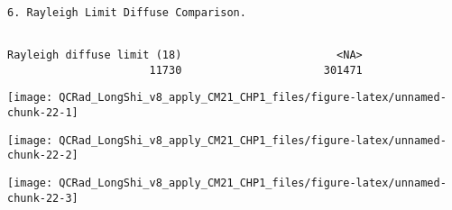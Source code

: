 \documentclass[
  10pt,
  a4paper,oneside]{article}
\newenvironment{Shaded}{\begin{snugshade}}{\end{snugshade}}
\newcommand{\AttributeTok}[1]{\textcolor[rgb]{0.77,0.63,0.00}{#1}}
\newcommand{\ConstantTok}[1]{\textcolor[rgb]{0.00,0.00,0.00}{#1}}
\newcommand{\DocumentationTok}[1]{\textcolor[rgb]{0.56,0.35,0.01}{\textbf{\textit{#1}}}}
\newcommand{\ErrorTok}[1]{\textcolor[rgb]{0.64,0.00,0.00}{\textbf{#1}}}
\newcommand{\FunctionTok}[1]{\textcolor[rgb]{0.00,0.00,0.00}{#1}}
\newcommand{\NormalTok}[1]{#1}
\newcommand{\SpecialCharTok}[1]{\textcolor[rgb]{0.00,0.00,0.00}{#1}}
\newcommand{\StringTok}[1]{\textcolor[rgb]{0.31,0.60,0.02}{#1}}
\begin{document}
\begin{Shaded}
\end{Shaded}

\begin{verbatim}

6. Rayleigh Limit Diffuse Comparison.
\end{verbatim}

\begin{verbatim}

Rayleigh diffuse limit (18)                        <NA> 
                      11730                      301471 
\end{verbatim}

\begin{center}\texttt{[image: QCRad\_LongShi\_v8\_apply\_CM21\_CHP1\_files/figure-latex/unnamed-chunk-22-1]} \end{center}

\begin{center}\texttt{[image: QCRad\_LongShi\_v8\_apply\_CM21\_CHP1\_files/figure-latex/unnamed-chunk-22-2]} \end{center}

\begin{center}\texttt{[image: QCRad\_LongShi\_v8\_apply\_CM21\_CHP1\_files/figure-latex/unnamed-chunk-22-3]} \end{center}
\end{document}
